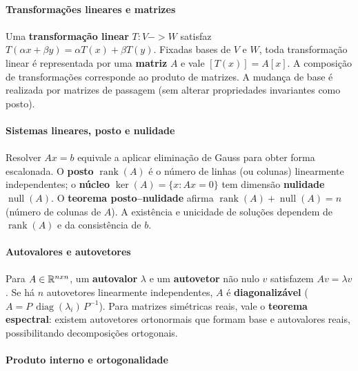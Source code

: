 \documentclass[12pt,a4paper]{article}
\def\emph#1{#1}%
\def\times{\string x}%
\def\to{->}%
\begin{document}
\paragraph{Transformações lineares e matrizes}
\paragraph{}
Uma \textbf{transformação linear} $T:V\to W$ satisfaz $T(\alpha x+\beta y)=\alpha T(x)+\beta T(y)$. Fixadas bases de $V$ e $W$, toda transformação linear é representada por uma \textbf{matriz} $A$ e vale $[T(x)]=A[x]$. A composição de transformações corresponde ao produto de matrizes. A mudança de base é realizada por matrizes de passagem (sem alterar propriedades invariantes como posto).

\paragraph{Sistemas lineares, posto e nulidade}
\paragraph{}
Resolver $Ax=b$ equivale a aplicar \emph{eliminação de Gauss} para obter forma escalonada. O \textbf{posto} $\operatorname{rank}(A)$ é o número de linhas (ou colunas) linearmente independentes; o \textbf{núcleo} $\ker(A)=\{x:Ax=0\}$ tem dimensão \textbf{nulidade} $\operatorname{null}(A)$. O \textbf{teorema posto--nulidade} afirma $\operatorname{rank}(A)+\operatorname{null}(A)=n$ (número de colunas de $A$). A existência e unicidade de soluções dependem de $\operatorname{rank}(A)$ e da consistência de $b$.

\paragraph{Autovalores e autovetores}
\paragraph{}
Para $A\in\mathbb{R}^{n\times n}$, um \textbf{autovalor} $\lambda$ e um \textbf{autovetor} não nulo $v$ satisfazem $Av=\lambda v$. Se há $n$ autovetores linearmente independentes, $A$ é \textbf{diagonalizável} ($A=P\,\operatorname{diag}(\lambda_i)\,P^{-1}$). Para matrizes simétricas reais, vale o \textbf{teorema espectral}: existem autovetores ortonormais que formam base e autovalores reais, possibilitando decomposições ortogonais.

\paragraph{Produto interno e ortogonalidade}
\end{document}

